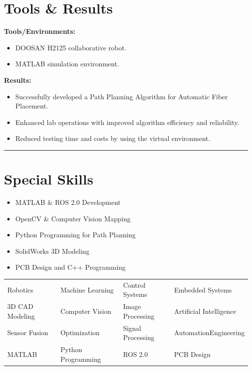\documentclass[a4paper]{article}
\begin{document}
\section*{Tools \& Results}
\textbf{Tools/Environments:}
\begin{itemize}[leftmargin=*, noitemsep]
    \item DOOSAN H2125 collaborative robot.
    \item MATLAB simulation environment.
\end{itemize}

\vspace{0.5em}
\textbf{Results:}
\begin{itemize}[leftmargin=*, noitemsep]
    \item Successfully developed a Path Planning Algorithm for Automatic Fiber Placement.
    \item Enhanced lab operations with improved algorithm efficiency and reliability.
    \item Reduced testing time and costs by using the virtual environment.
\end{itemize}

\vfill
\hrule
\vspace{0.5em}

\section*{Special Skills}
\begin{itemize}[leftmargin=*, noitemsep]
    \item MATLAB \& ROS 2.0 Development
    \item OpenCV \& Computer Vision Mapping
    \item Python Programming for Path Planning
    \item SolidWorks 3D Modeling
    \item PCB Design and C++ Programming
\end{itemize}



\noindent
\begin{tabularx}{\textwidth}{|>{\centering\arraybackslash}X|>{\centering\arraybackslash}X|>{\centering\arraybackslash}X|>{\centering\arraybackslash}X|}

    Robotics & Machine Learning & Control Systems & Embedded Systems \\ 
    3D CAD Modeling & Computer Vision & Image Processing & Artificial Intelligence \\ 
    Sensor Fusion & Optimization & Signal Processing & AutomationEngineering \\ 
    MATLAB & Python Programming & ROS 2.0 & PCB Design \\ 
\end{tabularx}



    
\end{document}

